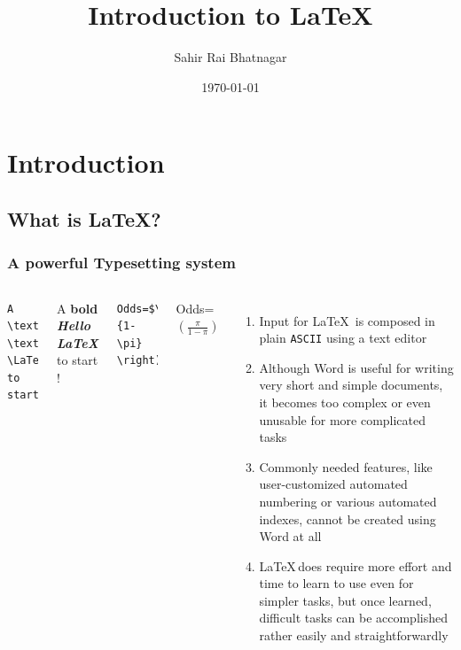 \documentclass[10pt]{beamer}
\title[\LaTeX Tutorial]{Introduction to \LaTeX} %
\author{Sahir Rai Bhatnagar} %
\institute[Queen's University] %
{
Queen's University \\ %
\medskip
\textit{12sb32@queensu.ca} %
}
\date{\today} %
\begin{document}
\maketitle


\section{Introduction}
\subsection{What is \LaTeX ?}
\begin{frame}[fragile]\frametitle{A powerful Typesetting system}

\begin{columns}[c] %

{\tiny
\begin{verbatim}
A \textbf{bold 
\textit{Hello \LaTeX}} 
to start!
\end{verbatim}
}
A \textbf{bold \textit{Hello \LaTeX}} to start !

{\tiny
\begin{verbatim}
Odds=$\left(\frac{\pi}{1-\pi} 
\right)$ 
\end{verbatim}
}

Odds=$\left( \frac{\pi}{1-\pi} \right) $




\small
\begin{enumerate}
\item Input for \LaTeX \, is composed in plain \texttt{ASCII} using a text editor
\item Although Word is useful for writing very short and simple documents, it becomes too complex or even unusable for more complicated tasks
\item Commonly needed features, like user-customized automated numbering or various automated indexes, cannot be created using Word at all
\item \LaTeX \,does require more effort and time to learn to use even for simpler tasks, but once learned, difficult tasks can be accomplished rather easily and straightforwardly
\end{enumerate}

\end{columns}

\end{frame}
\end{document}
